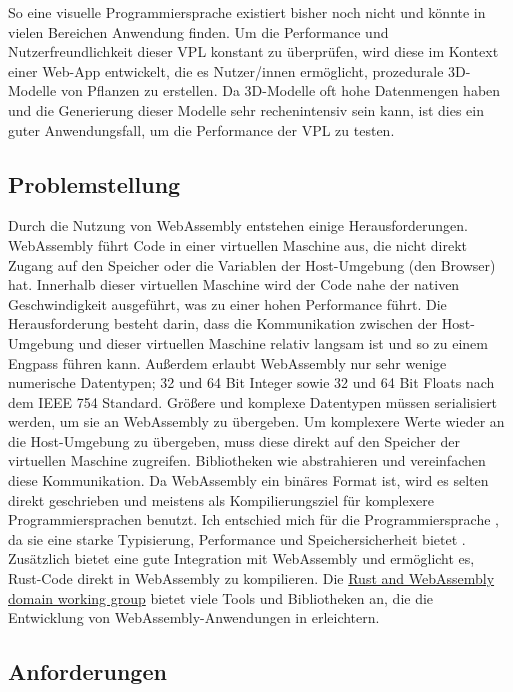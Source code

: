\documentclass[ngerman]{article}
\begin{document}
\br
So eine visuelle Programmiersprache existiert bisher noch nicht und könnte in vielen Bereichen Anwendung finden.
\br
Um die Performance und Nutzerfreundlichkeit dieser VPL konstant zu überprüfen, wird diese im Kontext einer Web-App entwickelt, die es Nutzer/innen ermöglicht, prozedurale 3D-Modelle von Pflanzen zu erstellen. 
Da 3D-Modelle oft hohe Datenmengen haben und die Generierung dieser Modelle sehr rechenintensiv sein kann, ist dies ein guter Anwendungsfall, um die Performance der VPL zu testen.

\pagebreak

\subsection{Problemstellung}

Durch die Nutzung von WebAssembly entstehen einige Herausforderungen. 
WebAssembly führt Code in einer virtuellen Maschine aus, die nicht direkt Zugang auf den Speicher oder die Variablen der Host-Umgebung (den Browser) hat.
Innerhalb dieser virtuellen Maschine wird der Code nahe der nativen Geschwindigkeit ausgeführt, was zu einer hohen Performance führt. 
Die Herausforderung besteht darin, dass die Kommunikation zwischen der Host-Umgebung und dieser virtuellen Maschine relativ langsam ist und so zu einem Engpass führen kann.
\br
Außerdem erlaubt WebAssembly nur sehr wenige numerische Datentypen; 32 und 64 Bit Integer sowie 32 und 64 Bit Floats nach dem IEEE 754 Standard. 
Größere und komplexe Datentypen müssen serialisiert werden, um sie an WebAssembly zu übergeben. 
Um komplexere Werte wieder an die Host-Umgebung zu übergeben, muss diese direkt auf den Speicher der virtuellen Maschine zugreifen.
Bibliotheken wie  abstrahieren und vereinfachen diese Kommunikation.
\br
Da WebAssembly ein binäres Format ist, wird es selten direkt geschrieben und meistens als Kompilierungsziel für komplexere Programmiersprachen benutzt.
Ich entschied mich für die Programmiersprache , da sie eine starke Typisierung, Performance und Speichersicherheit bietet \cite{bugden2022rust}.
Zusätzlich bietet  eine gute Integration mit WebAssembly und ermöglicht es, Rust-Code direkt in WebAssembly zu kompilieren. 
Die \href{https://rustwasm.github.io/}{Rust and WebAssembly domain working group} bietet viele Tools und Bibliotheken an, die die Entwicklung von WebAssembly-Anwendungen in  erleichtern.

\subsection{Anforderungen} 
\label{sec:Anforderungen}
\end{document}
